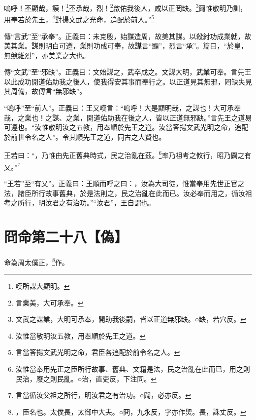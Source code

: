 嗚呼！丕顯哉，謨！\footnote{嘆所謀大顯明。}丕承哉，烈！\footnote{言業美，大可承奉。}啟佑我後人，咸以正罔缺。\footnote{文武之謀業，大明可承奉，開助我後嗣，皆以正道無邪缺。○缺，若穴反。}爾惟敬明乃訓，用奉若於先王，\footnote{汝惟當敬明汝五教，用奉順於先王之道。}對揚文武之光命，追配於前人。”\footnote{言當答揚文武光明之命，君臣各追配於前令名之人。}


{\noindent\zhuan{}\fzbyks 傳“言武”至“承奉”。正義曰：未克殷，始謀造周，故美其謀。以殺紂功成業就，故美其業。謀則明白可遵，業則功成可奉，故謀言“顯”，烈言“承”。篇曰，“於皇，無競維烈”，亦美業之大也。 \par}

{\noindent\zhuan{}\fzbyks 傳“文武”至“邪缺”。正義曰：文始謀之，武卒成之。文謀大明，武業可奉。言先王以此成功開道佑助我之後人，使我得安其事而奉行之。以正道見其無邪，罔缺失見其周備，故傳言“無邪缺”。 \par}

{\noindent\shu{}\fzkt “嗚呼”至“前人”。正義曰：王又嘆言：“嗚呼！大是顯明哉，之謀也！大可承奉哉，之業也！之謀、之業，開道佑助我在後之人，皆以正道無邪缺。”言先王之道易可遵也。“汝惟敬明汝之五教，用奉順於先王之道。汝當答揚文武光明之命，追配於前世令名之人”。令其順先王之道，同古之大賢也。 \par}

王若曰：“，乃惟由先正舊典時式，民之治亂在茲。\footnote{汝惟當奉用先正之臣所行故事、舊典、文籍是法，民之治亂在此而已，用之則民治，廢之則民亂。○治，直吏反，下注同。}率乃祖考之攸行，昭乃闢之有乂。”\footnote{言當循汝父祖之所行，明汝君之有治功。○闢，必亦反。}

{\noindent\shu{}\fzkt “王若”至“有乂”。正義曰：王順而呼之曰：，汝為大司徒，惟當奉用先世正官之法，諸臣所行故事舊典，於是法則之，民之治亂在此而已。汝必奉而用之，循汝祖考之所行，明汝君之有治功。”“汝君”，王自謂也。 \par}

\section{冏命第二十八【偽】}


命為周太僕正，\footnote{，臣名也。太僕長，太御中大夫。○冏，九永反，字亦作煛。長，誅丈反。}作。

